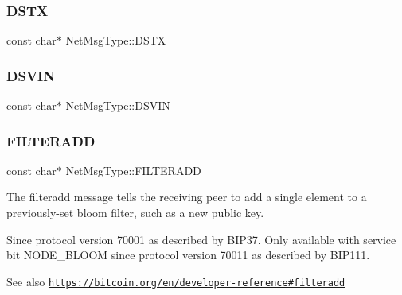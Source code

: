\subsubsection{\texorpdfstring{D\+S\+TX}{DSTX}}
{\footnotesize\ttfamily const char$\ast$ Net\+Msg\+Type\+::\+D\+S\+TX}

\mbox{\label{namespace_net_msg_type_a981eb2dfaefdde1edde3f23a4cb4c837}} 
\subsubsection{\texorpdfstring{D\+S\+V\+IN}{DSVIN}}
{\footnotesize\ttfamily const char$\ast$ Net\+Msg\+Type\+::\+D\+S\+V\+IN}

\mbox{\label{namespace_net_msg_type_a76b0d59904e55b6389aa7491655a2ef0}} 
\subsubsection{\texorpdfstring{F\+I\+L\+T\+E\+R\+A\+DD}{FILTERADD}}
{\footnotesize\ttfamily const char$\ast$ Net\+Msg\+Type\+::\+F\+I\+L\+T\+E\+R\+A\+DD}

The filteradd message tells the receiving peer to add a single element to a previously-\/set bloom filter, such as a new public key. \begin{DoxySince}{Since}
protocol version 70001 as described by B\+I\+P37. Only available with service bit N\+O\+D\+E\+\_\+\+B\+L\+O\+OM since protocol version 70011 as described by B\+I\+P111. 
\end{DoxySince}
\begin{DoxySeeAlso}{See also}
\href{https://bitcoin.org/en/developer-reference#filteradd}{\tt https\+://bitcoin.\+org/en/developer-\/reference\#filteradd} 
\end{DoxySeeAlso}
\mbox{\label{namespace_net_msg_type_adb4faffb24cda767d622b38fcd2c1a37}} 
